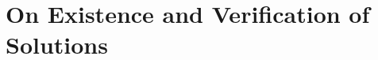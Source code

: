 \documentclass[letterpaper]{article} %
\newcommand{\TODO}[1]{\todo[inline]{ #1}}
\begin{document}
\section{On Existence and Verification of Solutions}
\label{sec:existence}

\end{document}
